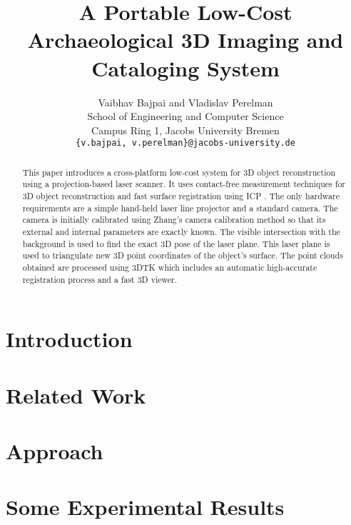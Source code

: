 \documentclass[conference]{IEEEtran}
\begin{document}
\title{A Portable Low-Cost Archaeological 3D Imaging and Cataloging System}

\author{
  Vaibhav Bajpai and Vladislav Perelman \\
  School of Engineering and Computer Science\\
  Campus Ring 1, Jacobs University Bremen\\
  \texttt{\{v.bajpai, v.perelman\}@jacobs-university.de}
}

\maketitle

\begin{abstract}
This paper introduces a cross-platform low-cost system for 3D object
reconstruction using a projection-based laser scanner. It uses contact-free
measurement techniques for 3D object reconstruction and fast surface
registration using \ac{ICP} \cite{besl:1992}. The only hardware requirements
are a simple hand-held laser line projector and a standard camera. The camera
is initially calibrated using Zhang's camera calibration method so that its
external and internal parameters are exactly known. The visible intersection
with the background is used to find the exact 3D pose of the laser plane. This
laser plane is used to triangulate new 3D point coordinates of the
object's surface. The point clouds obtained are processed using \ac{3DTK}
\cite{3dtk:2012} which includes an automatic high-accurate registration
process and a fast 3D viewer.
\end{abstract}

\section{Introduction}
\label{section:introduction}


\section{Related Work}
\label{section:relatedwork}


\section{Approach}
\label{section:approach}


\section{Some Experimental Results}
\label{section:results}

\end{document}
